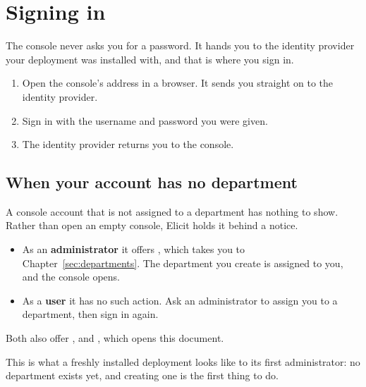 \documentclass[11pt, a4paper]{article}
\begin{document}
\section{Signing in}
\label{sec:signin}

The console never asks you for a password. It hands you to the identity provider your
deployment was installed with, and that is where you sign in.

\begin{enumerate}
  \item Open the console's address in a browser. It sends you straight on to the identity
        provider.
  \item Sign in with the username and password you were given.
  \item The identity provider returns you to the console.
\end{enumerate}


\subsection{When your account has no department}

A console account that is not assigned to a department has nothing to show. Rather than open an
empty console, Elicit holds it behind a notice.


\begin{itemize}
  \item As an \textbf{administrator} it offers , which takes you to
        Chapter~\ref{sec:departments}. The department you create is assigned to you, and the console opens.
  \item As a \textbf{user} it has no such action. Ask an administrator to assign you to a
        department, then sign in again.
\end{itemize}

Both also offer , and , which opens this document.

This is what a freshly installed deployment looks like to its first administrator: no
department exists yet, and creating one is the first thing to do.
\end{document}

